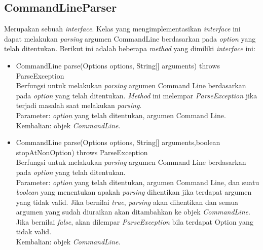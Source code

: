\subsection{CommandLineParser}
\label{subsec:commandlineparser}
Merupakan sebuah \textit{interface}. Kelas yang mengimplementasikan \textit{interface} ini dapat melakukan \textit{parsing} argumen CommandLine berdasarkan pada \textit{option} yang telah ditentukan. Berikut ini adalah beberapa \textit{method} yang dimiliki \textit{interface} ini: 
\begin{itemize}
\item CommandLine parse(Options options, String[] arguments) throws ParseException\\
Berfungsi untuk melakukan \textit{parsing} argumen Command Line berdasarkan pada \textit{option} yang telah ditentukan. \textit{Method} ini melempar \textit{ParseException} jika terjadi masalah saat melakukan \textit{parsing}.\\
Parameter: \textit{option} yang telah ditentukan, argumen Command Line.\\
Kembalian: objek \textit{CommandLine}.

\item CommandLine parse(Options options, String[] arguments,boolean stopAtNonOption) throws ParseException\\
Berfungsi untuk melakukan \textit{parsing} argumen Command Line berdasarkan pada \textit{option} yang telah ditentukan.\\
Parameter: \textit{option} yang telah ditentukan, argumen Command Line, dan suatu \textit{boolean} yang menentukan apakah \textit{parsing} dihentikan jika terdapat argumen yang tidak valid. Jika bernilai \textit{true}, \textit{parsing} akan dihentikan dan semua argumen yang sudah diuraikan akan ditambahkan ke objek \textit{CommandLine}. Jika bernilai \textit{false}, akan dilempar \textit{ParseException} bila terdapat Option yang tidak valid.\\
Kembalian: objek \textit{CommandLine}.
\end{itemize}


